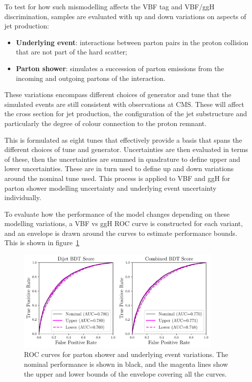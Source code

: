 To test for how such mismodelling affects the VBF tag and VBF/ggH discrimination, samples are evaluated with up and down variations on aspects of jet production:
\begin{itemize}[noitemsep]
    \item \textbf{Underlying event}: interactions between parton pairs in the proton collision that are not part of the hard scatter;
    \item \textbf{Parton shower}: simulates a succession of parton emissions from the incoming and outgoing partons of the interaction.
\end{itemize}
These variations encompass different choices of generator and tune that the simulated events are still consistent with observations at CMS. 
These will affect the cross section for jet production, the configuration of the jet substructure and particularly the degree of colour connection to the proton remnant.

This is formulated as eight tunes that effectively provide a basis that spans the different choices of tune and generator. 
Uncertainties are then evaluated in terms of these, then the uncertainties are summed in quadrature to define upper and lower uncertainties. 
These are in turn used to define up and down variations around the nominal tune used. 
This process is applied to VBF and ggH for parton shower modelling uncertainty and underlying event uncertainty individually. 

To evaluate how the performance of the model changes depending on these modelling variations, a VBF vs ggH ROC curve is constructed for each variant, and an envelope is drawn around the curves to estimate performance bounds. This is shown in figure~\ref{fig:event_categorisation:ps_variant_validation}
\begin{figure}[h!]
    \begin{center}
        \includegraphics[width=0.9\textwidth]{figures/event_selection/psvar_ROCs_PS.pdf}
    \end{center}
    \caption{ROC curves for parton shower and underlying event variations. The nominal performance is shown in black, 
             and the magenta lines show the upper and lower bounds of the envelope covering all the curves.}
    \label{fig:event_categorisation:ps_variant_validation}
\end{figure}


